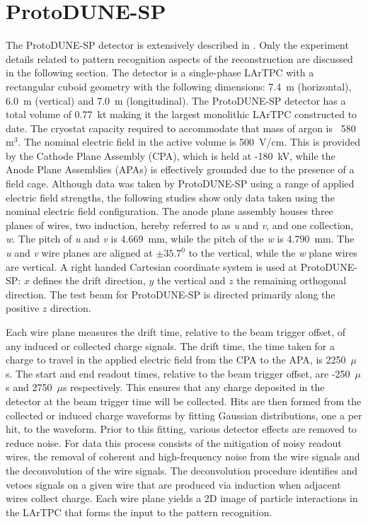 \section{ProtoDUNE-SP}
\label{sec:protodunesp}
The ProtoDUNE-SP detector is extensively described in \cite{pdtdr}.  Only the experiment details related to pattern recognition aspects of the reconstruction are discussed in the following section.  The detector is a single-phase LArTPC with a rectangular cuboid geometry with the following dimensions: 7.4~m (horizontal), 6.0~m (vertical) and 7.0~m (longitudinal).  The ProtoDUNE-SP detector has a total volume of 0.77~kt making it the largest monolithic LArTPC constructed to date.  The cryostat capacity required to accommodate that mass of argon is ~580~$\text{m}^{3}$.  The nominal electric field in the active volume is 500~V/cm.  This is provided by the Cathode Plane Assembly (CPA), which is held at -180~kV, while the Anode Plane Assemblies (APAs) is effectively grounded due to the presence of a field cage.  Although data was taken by ProtoDUNE-SP using a range of applied electric field strengths, the following studies show only data taken using the nominal electric field configuration.  The anode plane assembly houses three planes of wires, two induction, hereby referred to as \textit{u} and \textit{v}, and one collection, \textit{w}.  The pitch of \textit{u} and \textit{v} is 4.669~mm, while the pitch of the \textit{w} is 4.790~mm.  The \textit{u} and \textit{v} wire planes are aligned at $\pm35.7^{0}$ to the vertical, while the \textit{w} plane wires are vertical.  A right handed Cartesian coordinate system is used at ProtoDUNE-SP: $x$ defines the drift direction, $y$ the vertical and $z$ the remaining orthogonal direction.  The test beam for ProtoDUNE-SP is directed primarily along the positive $z$ direction.  

Each wire plane measures the drift time, relative to the beam trigger offset, of any induced or collected charge signals.  The drift time, the time taken for a charge to travel in the applied electric field from the CPA to the APA, is 2250~$\mu$s.  The start and end readout times, relative to the beam trigger offset, are -250~$\mu$s and 2750~$\mu$s respectively.  This ensures that any charge deposited in the detector at the beam trigger time will be collected.  Hits are then formed from the collected or induced charge waveforms by fitting Gaussian distributions, one a per hit, to the waveform.  Prior to this fitting, various detector effects are removed to reduce noise.  For data this process consists of the mitigation of noisy readout wires, the removal of coherent and high-frequency noise from the wire signals and the deconvolution of the wire signals.  The deconvolution procedure identifies and vetoes signals on a given wire that are produced via induction when adjacent wires collect charge.    Each wire plane yields a 2D image of particle interactions in the LArTPC that forms the input to the pattern recognition.

